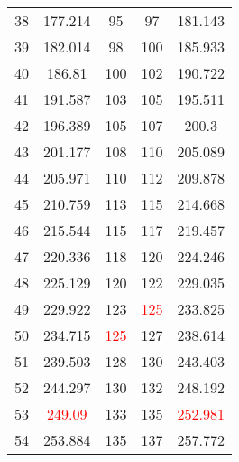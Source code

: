 \begin{table}
\begin{tabular}{|c|c|c|c|c|}
		38 & 177.214 & 95 & 97 & 181.143\\
		39 & 182.014 & 98 & 100 & 185.933\\
		40 & 186.81 & 100 & 102 & 190.722\\
		41 & 191.587 & 103 & 105 & 195.511\\
		42 & 196.389 & 105 & 107 & 200.3\\
		43 & 201.177 & 108 & 110 & 205.089\\
		44 & 205.971 & 110 & 112 & 209.878\\
		45 & 210.759 & 113 & 115 & 214.668\\
		46 & 215.544 & 115 & 117 & 219.457\\
		47 & 220.336 & 118 & 120 & 224.246\\
		48 & 225.129 & 120 & 122 & 229.035\\
		49 & 229.922 & 123 & \textcolor{red}{125} & 233.825\\
		50 & 234.715 & \textcolor{red}{125} & 127 & 238.614\\
		51 & 239.503 & 128 & 130 & 243.403\\
		52 & 244.297 & 130 & 132 & 248.192\\
		53 & \textcolor{red}{249.09} & 133 & 135 & \textcolor{red}{252.981}\\
		54 & 253.884 & 135 & 137 & 257.772\\
		\hline
	\end{tabular}
\end{table}